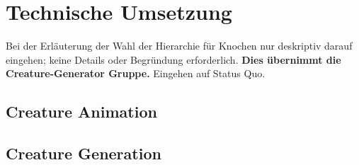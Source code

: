 \chapter{Technische Umsetzung}
\label{Technische_Umsetzung}

Bei der Erläuterung der Wahl der Hierarchie für Knochen nur deskriptiv darauf eingehen; keine Details oder Begründung erforderlich. \textbf{Dies übernimmt die Creature-Generator Gruppe.}
Eingehen auf Status Quo.
\section{Creature Animation}

\section{Creature Generation}
